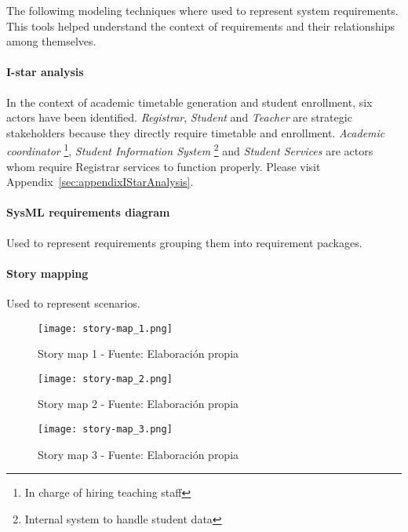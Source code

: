 The followimg modeling techniques where used to represent system requirements. This tools helped understand the context of requirements and their relationships among themselves.
\paragraph{I-star analysis} 
In the context of academic timetable generation and student enrollment, six actors have been identified.
\textit{Registrar}, \textit{Student} and \textit{Teacher} are strategic stakeholders because they directly require timetable and enrollment.
\textit{Academic coordinator} \footnote{In charge of hiring teaching staff}, \textit{Student Information System} \footnote{Internal system to handle student data} and \textit{Student Services} are actors whom require Registrar services to function properly.
Please visit Appendix~\ref{sec:appendixIStarAnalysis}.

\paragraph{SysML requirements diagram} Used to represent requirements grouping them into requirement packages.
\paragraph{Story mapping} Used to represent scenarios.
\begin{figure}[H]
    \centering
    \texttt{[image: story-map\_1.png]}
    \caption{Story map 1 - Fuente: Elaboración propia}
    \label{fig:story_map_1}
\end{figure}
\begin{figure}[H]
    \centering
    \texttt{[image: story-map\_2.png]}
    \caption{Story map 2 - Fuente: Elaboración propia}
    \label{fig:story_map_2}
\end{figure}
\begin{figure}[H]
    \centering
    \texttt{[image: story-map\_3.png]}
    \caption{Story map 3 - Fuente: Elaboración propia}
    \label{fig:story_map_3}
\end{figure}

